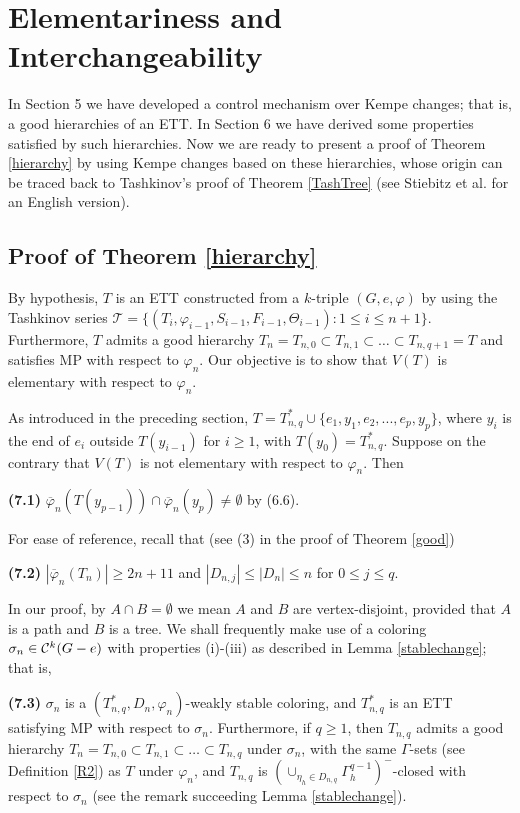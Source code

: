 \documentclass[11pt]{article}
\newcommand{\TT}{\mathcal {T}}
\newcommand{\phibar}{\overline{\varphi}}
\newcommand{\phiv}{\varphi}
\begin{document}
\section{Elementariness and Interchangeability} 

In Section 5 we have developed a control mechanism over Kempe changes; that is, a good hierarchies of an ETT.  In Section 6 
we have derived some properties satisfied by such hierarchies. Now we are ready to present a proof of Theorem \ref{hierarchy} 
by using Kempe changes based on these hierarchies, whose origin can be traced back to Tashkinov's proof of  
Theorem \ref{TashTree} \cite{T} (see Stiebitz et al. \cite{SSTF} for an English version). 

\subsection{Proof of Theorem \ref{hierarchy}}

By hypothesis, $T$ is an ETT constructed from a $k$-triple $(G,e, \varphi)$ by using the Tashkinov series 
$\TT=\{(T_i, \phiv_{i-1}, S_{i-1}, F_{i-1}, \Theta_{i-1}): 1\le i \le n+1\}$. Furthermore, $T$ admits a good hierarchy 
$T_n=T_{n,0} \subset T_{n,1} \subset \ldots \subset T_{n,q+1}=T$ and satisfies MP with respect to $\varphi_n$. Our 
objective is to show that $V(T)$ is elementary with respect to $\varphi_n$. 

As introduced in the preceding section,  $T=T_{n,q}^* \cup\{e_1,y_1,e_2,...,e_p,y_p\}$, where $y_i$ is the end 
of $e_i$ outside $T(y_{i-1})$ for $i\ge 1$, with $T(y_0)=T_{n,q}^*$. Suppose on the contrary that $V(T)$ is not 
elementary with respect to $\varphi_n$.  Then 


{\bf (7.1)} $\overline{\varphi}_n(T(y_{p-1}))\cap\overline{\varphi}_n(y_p) \ne \emptyset$ by (6.6). 

For ease of reference, recall that (see (3) in the proof of Theorem \ref{good})

{\bf (7.2)} $|\phibar_n(T_{n})|\ge 2n+11$ and $|D_{n,j}|\le |D_n|\le n$ for $0 \le j \le q$. 

In our proof, by $A\cap B=\emptyset$ we mean $A$ and $B$ are vertex-disjoint, provided that $A$ is a path and $B$ is a tree. 
We shall frequently make use of a coloring $\sigma_n \in {\cal C}^k(G-e)$ with properties (i)-(iii) as described 
in Lemma \ref{stablechange}; that is,

{\bf (7.3)} $\sigma_n$ is a $(T_{n,q}^*, D_n,\varphi_n)$-weakly stable coloring, and $T_{n,q}^*$ is an ETT 
satisfying MP with respect to $\sigma_n$. Furthermore, if $q \ge 1$, then $T_{n,q}$ admits a good hierarchy 
$T_n=T_{n,0} \subset T_{n,1} \subset \ldots \subset T_{n,q}$ under $\sigma_n$, with the same $\Gamma$-sets 
(see Definition \ref{R2}) as $T$ under $\varphi_n$, and $T_{n,q}$ is $(\cup_{\eta_h\in D_{n,q}}\Gamma^{q-1}_h)^-$-closed 
with respect to $\sigma_n$ (see the remark succeeding Lemma \ref{stablechange}).
\end{document}
